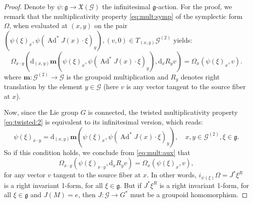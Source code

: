\documentclass[a4paper,11pt]{amsart}
\theoremstyle{definition}
\theoremstyle{remark}
\begin{document}
\begin{proof}
Denote by $\psi:{\mathfrak{g}}\to{\ensuremath{\mathfrak{X}}}({\mathcal{G}})$ the infinitesimal ${\mathfrak{g}}$-action.
For the proof, we remark that the multiplicativity property \eqref{eq:mult:symp} of the symplectic form $\Omega$, when
evaluated at $(x,y)$ on the pair $(\psi(\xi)_x,\psi(\operatorname{Ad}^*J(x)\cdot \xi)_y),(v,0)\in T_{(x,y)}{\mathcal{G}}^{(2)}$ yields:
\begin{equation}
\label{eq:mult:aux}
\Omega_{x\cdot y}({\mathrm d}_{(x,y)}{\mathbf{m}}(\psi(\xi)_x,\psi(\operatorname{Ad}^* J(x)\cdot \xi)_y),{\mathrm d}_x R_{y}v)=\Omega_x(\psi(\xi)_x,v).
\end{equation}
where ${\mathbf{m}}:{\mathcal{G}}^{(2)}\to{\mathcal{G}}$ is the groupoid multiplication and $R_y$ denotes right translation by the element $y\in{\mathcal{G}}$ (here $v$
is any vector tangent to the source fiber at $x$).

Now, since the Lie group $G$ is connected, the twisted
multiplicativity property \eqref{eq:twisted:2} is equivalent to
its infinitesimal version, which reads:
\begin{equation}
\label{eq:twisted:inft}
\psi(\xi)_{x\cdot y}={\mathrm d}_{(x,y)}{\mathbf{m}}(\psi(\xi)_x,\psi(\operatorname{Ad}^* J(x)\cdot \xi)_y),\quad x,y\in{\mathcal{G}}^{(2)}, \xi\in{\mathfrak{g}}.
\end{equation}
So if this condition holds, we conclude from \eqref{eq:mult:aux} that
\[ \Omega_{x\cdot y}(\psi(\xi)_{x\cdot y},{\mathrm d}_x R_{y}v)=\Omega_x(\psi(\xi)_x,v),\]
for any vector $v$ tangent to the source fiber at $x$. In other
words, $i_{\psi(\xi)}\Omega=J^*\xi^R$ is a right invariant 1-form,
for all $\xi\in{\mathfrak{g}}$. But if $J^*\xi^R$ is a right invariant
1-form, for all $\xi\in{\mathfrak{g}}$ and $J(M)=e$, then $J:{\mathcal{G}}\to G^*$ must
be a groupoid homomorphism.


\end{proof}
\end{document}
